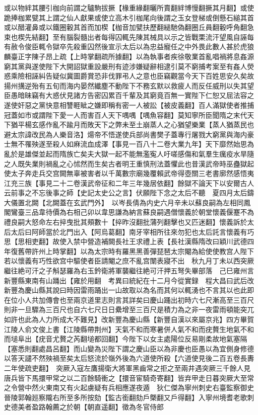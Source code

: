 或以物絆其腰引枷向前謂之驢駒拔撅【椽重緣翻曬所賣翻絆博慢翻撅其月翻】或使跪捧枷累甓其上謂之仙人獻果或使立高木引枷尾向後謂之玉女登梯或倒懸石縋其首或以醋灌鼻或以鐵圈轂其首而加楔【枷音加甓扶歷翻縋馳偽翻圈丘員翻轂呼角翻急束也楔先結翻】至有腦裂髓出者每得囚輒先陳其械具以示之皆戰栗流汗望風自誣每有赦令俊臣輒令獄卒先殺重囚然後宣示太后以為忠益寵任之中外畏此數人甚於虎狼麟臺正字陳子昂上疏【上時掌翻疏所據翻】以為執事者疾徐敬業首亂唱禍將息姦源窮其黨與遂使陛下大開詔獄重設嚴刑有迹涉嫌疑辭相逮引莫不窮捕考案至有姦人熒惑乘險相誣糾告疑似冀圖爵賞恐非伐罪弔人之意也臣竊觀當今天下百姓思安久矣故揚州搆逆殆有五旬而海内晏然纎塵不動陛下不務玄默以救疲人而反任威刑以失其望臣愚暗昧竊有大惑伏見諸方告密囚累百千輩及其窮竟百無一實陛下仁恕又屈法容之遂使奸惡之黨快意相讐睚眦之嫌即稱有密一人被訟【被皮義翻】百人滿獄使者推捕冠蓋如市或謂陛下愛一人而害百人天下喁喁【喁魚容翻】莫知寧所臣聞隋之末代天下猶平楊玄感作亂不踰月而敗天下之弊未至土崩蒸人之心猶望樂業【蒸人猶蒸民也避太宗諱改民為人樂音洛】煬帝不悟遂使兵部尚書樊子蓋專行屠戮大窮黨與海内豪士無不罹殃遂至殺人如麻流血成澤【事見一百八十二卷大業九年】天下靡然始思為亂於是雄傑並起而隋族亡矣夫大獄一起不能無濫寃人吁嗟感傷和氣羣生癘疫水旱隨之人既失業則禍亂之心怵然而生矣古者明王重慎刑法蓋懼此也昔漢武帝時巫蠱獄起使太子奔走兵交宫闕無辜被害者以千萬數宗廟幾覆賴武帝得壺關三老書廓然感悟夷江充三族【事見二十二卷漢武帝征和二年三年幾居依翻】餘獄不論天下以安爾古人云前事之不忘後事之師【史記太史公之言】伏願陛下念之太后不聽　夏四月太后鑄大儀置北闕【北闕蓋在玄武門外】　以岑長倩為内史六月辛未以蘇良嗣為左相同鳳閣鸞臺三品韋待價為右相己卯以韋思謙為納言蘇良嗣遇僧懷義於朝堂懷義偃蹇不為禮良嗣大怒命左右捽曳批其頰數十【捽昨沒翻批蒲列翻擊也又匹迷翻】懷義訴於太后太后曰阿師當於北門出入【阿烏葛翻】南牙宰相所往來勿犯也太后託言懷義有巧思【思相吏翻】故使入禁中營造補闕長社王求禮上表【長社漢縣隋改曰穎川武德四年復舊帶許州上時掌翻】以為太宗時有羅黑黑善彈琵琶太宗閹為給使使教宫人陛下若以懷義有巧性欲宫中驅使者臣請閹之庶不亂宫闈表寢不出　秋九月丁未以西突厥繼往絶可汗之子斛瑟羅為右玉鈐衛將軍襲繼往絶可汗押五弩失畢部落　己巳雍州言新豐縣東南有山踊出【雍於用翻　考異曰統紀在十二月今從實録　程大昌曰武后改新豐為慶山縣其說曰時因雷雨踊出一山故取以為名而其何以輒湧也不言其以也此即在位小人共加傳會也至兩京道里志則言其詳矣曰慶山踊出初時六七尺漸高至三百尺則非一旦驟為三百尺也自六七尺日日纍增至三百尺是積力為之非一夜雷雨頓能突兀如許也此為人力所成大不難見】改新豐為慶山縣【新豐自漢以來屬京兆】四方畢賀江陵人俞文俊上書【江陵縣帶荆州】天氣不和而寒暑併人氣不和而疣贅生地氣不和而塠阜出【疣音尤贅之芮翻塠都回翻】今陛下以女主處陽位反易剛柔故地氣塞隔【塞悉則翻處昌呂翻】而山變為災陛下謂之慶山臣以為非慶也臣愚以為宜側身修德以答天譴不然殃禍至矣太后怒流於嶺外後為六道使所殺【六道使見後二百五卷長夀二年使疏吏翻】　突厥入寇左鷹揚衛大將軍黑齒常之拒之至兩井遇突厥三千餘人見唐兵皆下馬擐甲常之以二百餘騎衝之【擐音宦騎奇寄翻】皆弃甲走日暮突厥大至常之令營中然火東南又有火起虜疑有兵相應遂夜遁　狄仁傑為寧州刺史右臺監察御史晉陵郭翰廵察隴右所至多所按劾【監古銜翻劾戶槩翻又戶得翻】入寧州境耆老歌刺史德美者盈路翰薦之於朝【朝直遥翻】徵為冬官侍郎

